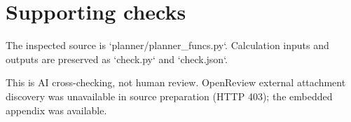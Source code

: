 \documentclass[10pt]{article}
\begin{document}
\section*{Supporting checks}
The inspected source is `planner/planner\_funcs.py`. Calculation inputs and outputs are preserved as `check.py` and `check.json`.\par
This is AI cross-checking, not human review. OpenReview external attachment discovery was unavailable in source preparation (HTTP 403); the embedded appendix was available.\par
\end{document}
